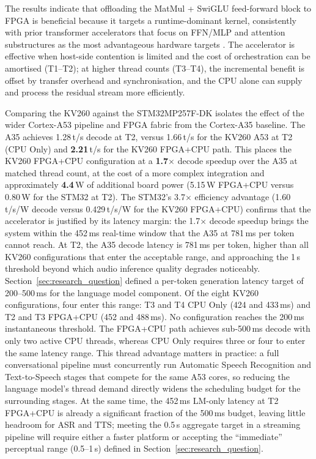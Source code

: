 \documentclass[manuscript,]{acmart} %
\begin{document}
The results indicate that offloading the MatMul + SwiGLU feed-forward block to FPGA is beneficial because it targets a runtime-dominant kernel, consistently with prior transformer accelerators that focus on FFN/MLP and attention substructures as the most advantageous hardware targets \cite{lu2020hw-mha}.
The accelerator is effective when host-side contention is limited and the cost of orchestration can be amortised (T1--T2); at higher thread counts (T3--T4), the incremental benefit is offset by transfer overhead and synchronisation, and the CPU alone can supply and process the residual stream more efficiently.

Comparing the KV260 against the STM32MP257F-DK isolates the effect of the
wider Cortex-A53 pipeline and FPGA fabric from the Cortex-A35 baseline.
The A35 achieves 1.28\,t/s decode at T2, versus 1.66\,t/s for
the KV260 A53 at T2 (CPU Only) and \textbf{2.21}\,t/s for the KV260 FPGA+CPU path.
This places the KV260 FPGA+CPU configuration at a \textbf{1.7$\times$} decode
speedup over the A35 at matched thread count, at the cost of a more complex
integration and approximately \textbf{4.4}\,W of additional board power
(5.15\,W FPGA+CPU versus 0.80\,W for the STM32 at T2).
The STM32's 3.7$\times$ efficiency advantage (1.60\,t/s/W decode versus 0.429\,t/s/W for the KV260 FPGA+CPU) confirms that the accelerator is justified by its latency margin: the 1.7$\times$ decode speedup brings the system within the 452\,ms real-time window that the A35 at 781\,ms per token cannot reach.
At T2, the A35 decode latency is 781\,ms per token, higher than all KV260
configurations that enter the acceptable range, and approaching the 1\,s threshold
beyond which audio inference quality degrades noticeably.
Section~\ref{sec:research_question} defined a per-token generation latency target
of 200--500\,ms for the language model component.
Of the eight KV260 configurations, four enter this range: T3 and T4 CPU Only
(424 and 433\,ms) and T2 and T3 FPGA+CPU (452 and 488\,ms).
No configuration reaches the 200\,ms instantaneous threshold.
The FPGA+CPU path achieves sub-500\,ms decode with only two active CPU threads,
whereas CPU Only requires three or four to enter the same latency range.
This thread advantage matters in practice: a full conversational pipeline must
concurrently run Automatic Speech Recognition and Text-to-Speech stages that compete for the same A53 cores, so
reducing the language model's thread demand directly widens the scheduling
budget for the surrounding stages.
At the same time, the 452\,ms LM-only latency at T2 FPGA+CPU is already a
significant fraction of the 500\,ms budget, leaving little headroom for ASR
and TTS; meeting the 0.5\,s aggregate target in a streaming pipeline will
require either a faster platform or accepting the ``immediate'' perceptual range
(0.5--1\,s) defined in Section~\ref{sec:research_question}.
\end{document}
